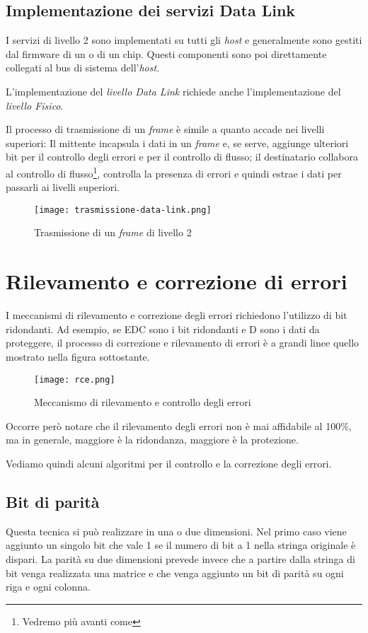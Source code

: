 \subsection{Implementazione dei servizi Data Link}
I servizi di livello 2 sono implementati su tutti gli \emph{host} e generalmente sono
gestiti dal firmware di un  o di un chip.
Questi componenti sono poi direttamente collegati al bus di sistema dell'\emph{host}.

\begin{note}
    L'implementazione del \emph{livello Data Link} richiede anche l'implementazione
    del \emph{livello Fisico}.
\end{note}\noindent
Il processo di trasmissione di un \emph{frame} è simile a quanto accade nei livelli
superiori: Il mittente incapsula i dati in un \emph{frame} e, se serve, aggiunge
ulteriori bit per il controllo degli errori e per il controllo di flusso; il
destinatario collabora al controllo di flusso\footnote{Vedremo più avanti come},
controlla la presenza di errori e quindi estrae i dati per passarli ai livelli
superiori.
\begin{figure}[h!]
    \centering
    \texttt{[image: trasmissione-data-link.png]}
    \caption{Trasmissione di un \emph{frame} di livello 2}
\end{figure}

\section{Rilevamento e correzione di errori}
I meccanismi di rilevamento e correzione degli errori richiedono l'utilizzo di
bit ridondanti. Ad esempio, se EDC sono i bit ridondanti e D sono i dati da
proteggere, il processo di correzione e rilevamento di errori è a grandi linee
quello mostrato nella figura sottostante.

\begin{figure}[h!]
    \centering
    \texttt{[image: rce.png]}
    \caption{Meccanismo di rilevamento e controllo degli errori}
\end{figure}\noindent
Occorre però notare che il rilevamento degli errori non è mai affidabile al 100\%,
ma in generale, maggiore è la ridondanza, maggiore è la protezione.

\bigskip\noindent
Vediamo quindi alcuni algoritmi per il controllo e la correzione degli errori.

\subsection{Bit di parità}
Questa tecnica si può realizzare in una o due dimensioni. Nel primo caso viene
aggiunto un singolo bit che vale 1 se il numero di bit a 1 nella stringa
originale è dispari. La parità su due dimensioni prevede invece che a partire
dalla stringa di bit venga realizzata una matrice e che venga aggiunto un bit di
parità su ogni riga e ogni colonna.

